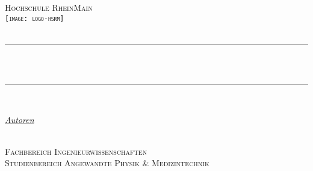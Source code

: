 \begin{titlepage} 
	\newcommand{\HRule}{\rule{\linewidth}{0.5mm}} 	
	\centering
	\textsc{\Large Hochschule RheinMain \\
		\texttt{[image: logo-hsrm]}\\[1cm]}
	\textsc{\LARGE \titelLV}\\[0.5cm]
		\HRule\\[0.4cm]
	{\huge\bfseries \untertitela}\\[0.4cm] %
		\HRule\\[1.5cm]
	\begin{minipage}{0.4\textwidth}
		\large
		\textit{\underline{Autoren}}\\[0.5cm]
		\textsc{\nameA}\\[0.5cm]
\end{minipage}
\vfill\vfill\vfill 
\textsc{\Large Fachbereich Ingenieurwissenschaften}\\[0.5cm]
\textsc{\large Studienbereich Angewandte Physik \& Medizintechnik}\\[0.5cm] 
\vfill	
\end{titlepage}
